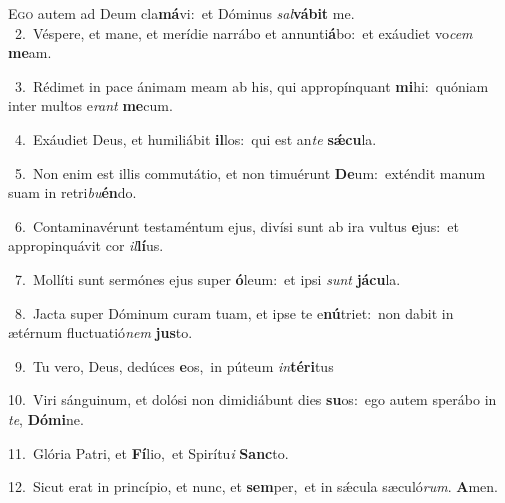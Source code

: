 \lettrine{\initial\textcolor{\initialcolor}{E}}{go} autem ad Deum cla\-\textbf{má}\-vi:~\star et Dóminus \textit{sal}\-\textbf{vá}\textbf{bit} me.\\
{\numbfont\textcolor{\numbcolor}{~2.}}~Véspere, et mane, et merídie narrábo et annunti\-\textbf{á}\-bo:~\star et exáudiet vo\textit{cem} \textbf{me}\-am.\par
{\numbfont\textcolor{\numbcolor}{~3.}}~Rédimet in pace ánimam meam ab his, qui appropínquant \textbf{mi}\-hi:~\star quóniam inter multos e\textit{rant} \textbf{me}\-cum.\par
{\numbfont\textcolor{\numbcolor}{~4.}}~Exáudiet Deus, et humiliábit \textbf{il}\-los:~\star qui est an\textit{te} \textbf{sǽ}\-\textbf{cu}la.\par
{\numbfont\textcolor{\numbcolor}{~5.}}~Non enim est illis commutátio, et non timuérunt \textbf{De}\-um:~\star exténdit manum suam in retri\-\textit{bu}\-\textbf{én}do.\par
{\numbfont\textcolor{\numbcolor}{~6.}}~Contaminavérunt testaméntum ejus, divísi sunt ab ira vultus \textbf{e}\-jus:~\star et appropinquávit cor \textit{il}\-\textbf{lí}us.\par
{\numbfont\textcolor{\numbcolor}{~7.}}~Mollíti sunt sermónes ejus super \textbf{ó}\-leum:~\star et ipsi \textit{sunt} \textbf{já}\-\textbf{cu}la.\par
{\numbfont\textcolor{\numbcolor}{~8.}}~Jacta super Dóminum curam tuam, et ipse te e\-\textbf{nú}\-triet:~\star non dabit in ætérnum fluctuatió\textit{nem} \textbf{jus}\-to.\par
{\numbfont\textcolor{\numbcolor}{~9.}}~Tu vero, Deus, dedúces \textbf{e}\-os,~\star in púteum \textit{in}\-\textbf{tér}\textbf{i}tus\par
{\numbfont\textcolor{\numbcolor}{10.}}~Viri sánguinum, et dolósi non dimidiábunt dies \textbf{su}\-os:~\star ego autem sperábo in \textit{te}\-, \textbf{Dó}\-\textbf{mi}ne.\par
{\numbfont\textcolor{\numbcolor}{11.}}~Glória Patri, et \textbf{Fí}\-lio,~\star et Spirítu\textit{i} \textbf{Sanc}\-to.\par
{\numbfont\textcolor{\numbcolor}{12.}}~Sicut erat in princípio, et nunc, et \textbf{sem}\-per,~\star et in sǽcula sæculó\-\textit{rum}\-. \textbf{A}\-men.\par
